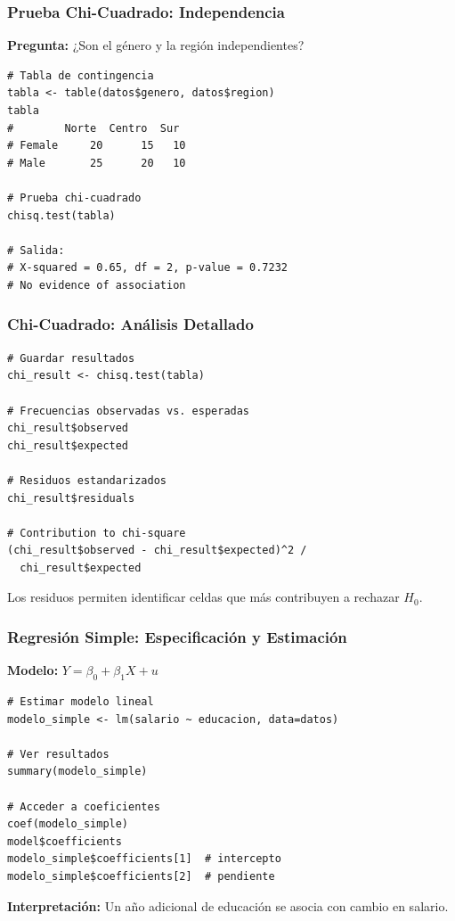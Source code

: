 \documentclass[aspectratio=169,11pt]{beamer}
\begin{document}
\begin{frame}[fragile]
  \frametitle{Prueba Chi-Cuadrado: Independencia}

  \textbf{Pregunta:} ¿Son el género y la región independientes?

  \begin{lstlisting}
# Tabla de contingencia
tabla <- table(datos$genero, datos$region)
tabla
#        Norte  Centro  Sur
# Female     20      15   10
# Male       25      20   10

# Prueba chi-cuadrado
chisq.test(tabla)

# Salida:
# X-squared = 0.65, df = 2, p-value = 0.7232
# No evidence of association
  \end{lstlisting}
\end{frame}

\begin{frame}[fragile]
  \frametitle{Chi-Cuadrado: Análisis Detallado}

  \begin{lstlisting}
# Guardar resultados
chi_result <- chisq.test(tabla)

# Frecuencias observadas vs. esperadas
chi_result$observed
chi_result$expected

# Residuos estandarizados
chi_result$residuals

# Contribution to chi-square
(chi_result$observed - chi_result$expected)^2 /
  chi_result$expected
  \end{lstlisting}

  \small
  Los residuos permiten identificar celdas que más contribuyen a rechazar $H_0$.
\end{frame}

\begin{frame}[fragile]
  \frametitle{Regresión Simple: Especificación y Estimación}

  \textbf{Modelo:} $Y = \beta_0 + \beta_1 X + u$

  \begin{lstlisting}
# Estimar modelo lineal
modelo_simple <- lm(salario ~ educacion, data=datos)

# Ver resultados
summary(modelo_simple)

# Acceder a coeficientes
coef(modelo_simple)
model$coefficients
modelo_simple$coefficients[1]  # intercepto
modelo_simple$coefficients[2]  # pendiente
  \end{lstlisting}

  \small
  \textbf{Interpretación:} Un año adicional de educación se asocia con cambio en salario.
\end{frame}
\end{document}
